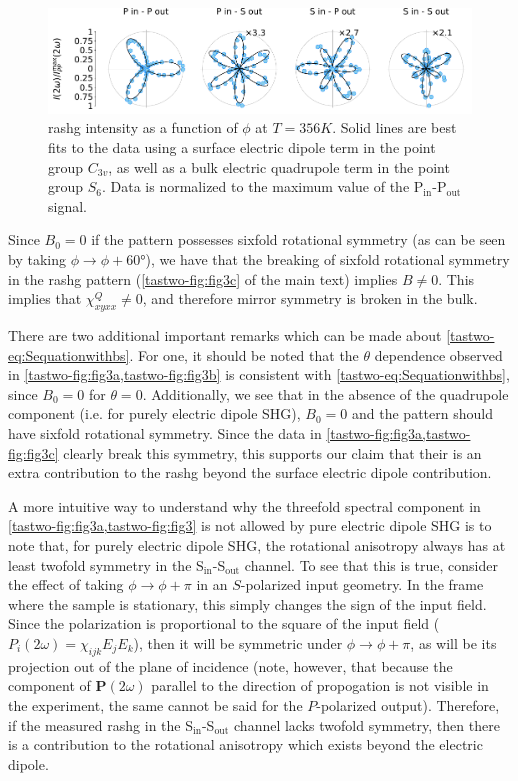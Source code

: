 \begin{figure}
\includegraphics[width=\textwidth]{./gfx/ch5/figS4.pdf}
\caption[Electric quadrupole RA-SHG in \tastwo ($T=\qty{356}{K}$)]{\label{tastwo-fig:356K}\gls{rashg} intensity as a function of $\phi$ at $T=356K$.
Solid lines are best fits to the data using a surface electric dipole term in the point group $C_{3v}$, as well as a bulk electric quadrupole term in the point group $S_6$.
Data is normalized to the maximum value of the P$_\mathrm{in}$-P$_\mathrm{out}$ signal.}
\end{figure}
Since $B_0=0$ if the pattern possesses sixfold rotational symmetry (as can be seen by taking $\phi\to\phi+\ang{60}$), we have that the breaking of sixfold rotational symmetry in the \gls{rashg} pattern (\cref{tastwo-fig:fig3c} of the main text) implies $B\neq 0$.
This implies that $\chi^Q_{xyxx} \neq 0$, and therefore mirror symmetry is broken in the bulk.

There are two additional important remarks which can be made about \cref{tastwo-eq:Sequationwithbs}.
For one, it should be noted that the $\theta$ dependence observed in \cref{tastwo-fig:fig3a,tastwo-fig:fig3b} is consistent with \cref{tastwo-eq:Sequationwithbs}, since $B_0=0$ for $\theta=0$.
Additionally, we see that in the absence of the quadrupole component (i.e. for purely electric dipole SHG), $B_0 = 0$ and the pattern should have sixfold rotational symmetry.
Since the data in \cref{tastwo-fig:fig3a,tastwo-fig:fig3c} clearly break this symmetry, this supports our claim that their is an extra contribution to the \gls{rashg} beyond the surface electric dipole contribution.

A more intuitive way to understand why the threefold spectral component in \cref{tastwo-fig:fig3a,tastwo-fig:fig3} is not allowed by pure electric dipole SHG is to note that, for purely electric dipole SHG, the rotational anisotropy always has at least twofold symmetry in the S$_\mathrm{in}$-S$_\mathrm{out}$ channel.
To see that this is true, consider the effect of taking $\phi\rightarrow\phi+\pi$ in an $S$-polarized input geometry.
In the frame where the sample is stationary, this simply changes the sign of the input field. 
Since the polarization is proportional to the square of the input field ($P_i(2\omega) = \chi_{ijk}E_j E_k$), then it will be symmetric under $\phi\rightarrow\phi+\pi$, as will be its projection out of the plane of incidence (note, however, that because the component of $\bm{P}(2\omega)$ parallel to the direction of propogation is not visible in the experiment, the same cannot be said for the $P$-polarized output).
Therefore, if the measured \gls{rashg} in the S$_\mathrm{in}$-S$_\mathrm{out}$ channel lacks twofold symmetry, then there is a contribution to the rotational anisotropy which exists beyond the electric dipole.

